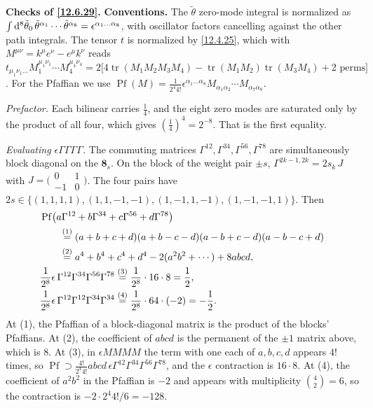 \begin{tcolorbox}[breakable]
	\begin{remark}
		\textbf{Checks of \eqref{12.6.29}.} \textbf{Conventions.} The $\tilde\theta$ zero-mode integral is normalized as $\int\mathrm{d}^{8}\tilde\theta_{0}\,\tilde\theta^{\alpha_{1}}\cdots\tilde\theta^{\alpha_{8}}=\epsilon^{\alpha_{1}\dots\alpha_{8}}$, with oscillator factors cancelling against the other path integrals. The tensor $t$ is normalized by \eqref{12.4.25}, which with $M^{\mu\nu}=k^{\mu}e^{\nu}-e^{\mu}k^{\nu}$ reads $t_{\mu_{1}\nu_{1}\dots}M_{1}^{\mu_{1}\nu_{1}}\cdots M_{4}^{\mu_{4}\nu_{4}}=2\bigl[4\operatorname{tr}(M_{1}M_{2}M_{3}M_{4})-\operatorname{tr}(M_{1}M_{2})\operatorname{tr}(M_{3}M_{4})+2\text{ perms}\bigr]$. For the Pfaffian we use $\operatorname{Pf}(M)=\frac{1}{2^{4}4!}\epsilon^{\alpha_{1}\dots\alpha_{8}}M_{\alpha_{1}\alpha_{2}}\cdots M_{\alpha_{7}\alpha_{8}}$.

		\emph{Prefactor.} Each bilinear carries $\frac14$, and the eight zero modes are saturated only by the product of all four, which gives $(\frac14)^{4}=2^{-8}$. That is the first equality.

		\emph{Evaluating $\epsilon\Gamma\Gamma\Gamma\Gamma$.} The commuting matrices $\Gamma^{12},\Gamma^{34},\Gamma^{56},\Gamma^{78}$ are simultaneously block diagonal on the $\mathbf 8_{s}$. On the block of the weight pair $\pm s$, $\Gamma^{2k-1,2k}=2s_{k}\,J$ with $J=\bigl(\begin{smallmatrix}0&1\\-1&0\end{smallmatrix}\bigr)$. The four pairs have $2s\in\{(1,1,1,1),(1,1,-1,-1),(1,-1,1,-1),(1,-1,-1,1)\}$. Then
		\begin{align*}
			&\operatorname{Pf}\bigl(a\Gamma^{12}+b\Gamma^{34}+c\Gamma^{56}+d\Gamma^{78}\bigr)\\
			&\qquad\overset{(1)}{=} (a+b+c+d)(a+b-c-d)(a-b+c-d)(a-b-c+d)\\
			&\qquad\overset{(2)}{=} a^{4}+b^{4}+c^{4}+d^{4}-2(a^{2}b^{2}+\cdots)+8abcd ,\\
			&\frac{1}{2^{8}}\epsilon\,\Gamma^{12}\Gamma^{34}\Gamma^{56}\Gamma^{78}\overset{(3)}{=} \frac{1}{2^{8}}\cdot16\cdot8=\frac12 ,\\
			&\frac{1}{2^{8}}\epsilon\,\Gamma^{12}\Gamma^{12}\Gamma^{34}\Gamma^{34}\overset{(4)}{=} \frac{1}{2^{8}}\cdot64\cdot(-2)=-\frac12 .
		\end{align*}
		At (1), the Pfaffian of a block-diagonal matrix is the product of the blocks' Pfaffians. At (2), the coefficient of $abcd$ is the permanent of the $\pm1$ matrix above, which is $8$. At (3), in $\epsilon MMMM$ the term with one each of $a,b,c,d$ appears $4!$ times, so $\operatorname{Pf}\supset\frac{4!}{2^{4}4!}abcd\,\epsilon\Gamma^{12}\Gamma^{34}\Gamma^{56}\Gamma^{78}$, and the $\epsilon$ contraction is $16\cdot8$. At (4), the coefficient of $a^{2}b^{2}$ in the Pfaffian is $-2$ and appears with multiplicity $\binom42=6$, so the contraction is $-2\cdot2^{4}4!/6=-128$.


\end{remark}
\end{tcolorbox}
